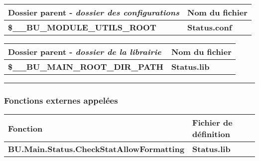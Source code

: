 \documentclass[a4paper,10pt]{article}
\begin{document}
    \begin{justify}
        \begin{tabular}{|l|l|}
            \hline
            \textbf{Dossier parent} - \textit{dossier des configurations}    & \textbf{Nom du fichier}\\
            \hline
            \textbf{\color{vars}\$\_\_BU\_MODULE\_UTILS\_ROOT}      & \textbf{\color{path}Status.conf}\\
            \hline
        \end{tabular}


        \begin{tabular}{|l|l|}
            \hline
            \textbf{Dossier parent} - \textit{dossier de la librairie}       & \textbf{Nom du fichier}\\
            \hline
            \textbf{\color{vars}\$\_\_BU\_MAIN\_ROOT\_DIR\_PATH}    & \textbf{\color{path}Status.lib}\\
            \hline
        \end{tabular}
    \end{justify}

    \setlength{\parskip}{2em}



    \color{sec3}\par\noindent\rule{\textwidth}{0.4pt}\color{text}\setlength{\parskip}{1em}

    \color{sec3}
    \subsubsection{Fonctions externes appelées}\color{text}

    \begin{justify}
        \begin{tabular}{|l|l|}
            \hline
            \textbf{Fonction} & \textbf{Fichier de définition}\\
            \hline
            \textbf{\color{func}BU.Main.Status.CheckStatAllowFormatting} & \textbf{\color{path}Status.lib}\\
            \hline
        \end{tabular}
    \end{justify}

    \setlength{\parskip}{2em}


\end{document}
